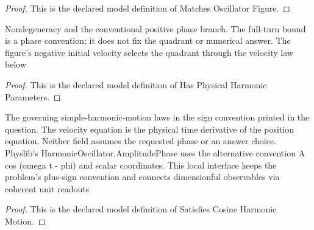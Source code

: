 \begin{proof}
  This is the declared model definition of Matches Oscillator Figure.
\end{proof}
\begin{definition}
  \label{def:physics:phyx-mini-0251:phyxminiproblems-problemphyxmini0251-hasphysicalharmonicparameters}
  Nondegeneracy and the conventional positive phase branch. The full-turn bound is a phase convention; it does not fix the quadrant or numerical answer. The figure's negative initial velocity selects the quadrant through the velocity law below
\end{definition}
\begin{proof}
  This is the declared model definition of Has Physical Harmonic Parameters.
\end{proof}
\begin{definition}
  \label{def:physics:phyx-mini-0251:phyxminiproblems-problemphyxmini0251-satisfiescosineharmonicmotion}
  The governing simple-harmonic-motion laws in the sign convention printed in the question. The velocity equation is the physical time derivative of the position equation. Neither field assumes the requested phase or an answer choice. Physlib's HarmonicOscillator.AmplitudePhase uses the alternative convention A cos (omega t - phi) and scalar coordinates. This local interface keeps the problem's plus-sign convention and connects dimensionful observables via coherent unit readouts
\end{definition}
\begin{proof}
  This is the declared model definition of Satisfies Cosine Harmonic Motion.
\end{proof}
